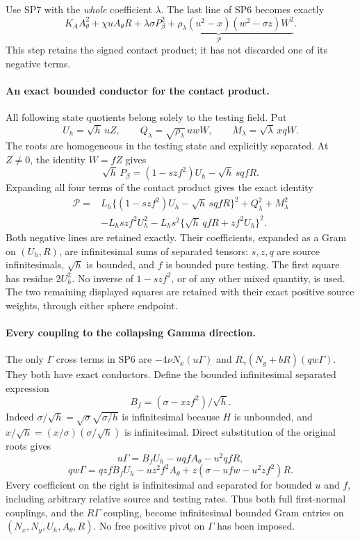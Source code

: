 Use SP7 with the \emph{whole} coefficient $\lambda$. The last line of
SP6 becomes exactly
\[
 K_A A_\theta^2+\chi uA_\theta R+
 \underbrace{\lambda\sigma P_\beta^2+
       \rho_\lambda(u^2-x)(w^2-\sigma z)W^2}_{\mathscr P}.
 \tag{BS2}
\]
This step retains the signed contact product; it has not discarded
one of its negative terms.

\paragraph{An exact bounded conductor for the contact product.}
All following state quotients belong solely to the testing field.
Put
\[
 U_h=\sqrt h\,uZ,\qquad
 Q_\lambda=\sqrt{\rho_\lambda}\,uwW,\qquad
 M_\lambda=\sqrt\lambda\,xqW.
\]
The roots are homogeneous in the testing state and explicitly separated.
At $Z\ne0$, the identity $W=fZ$ gives
\[
 \sqrt h\,P_\beta=(1-szf^2)U_h-\sqrt h\,sqfR.
 \tag{BS3}
\]
Expanding all four terms of the contact product gives the exact identity
\[
\begin{split}
 \mathscr P={}&L_h\{(1-szf^2)U_h-\sqrt h\,sqfR\}^2
                  +Q_\lambda^2+M_\lambda^2\\
 &-L_hszf^2U_h^2
       -L_hs^2\{\sqrt h\,qfR+zf^2U_h\}^2 .
\end{split}                                                   \tag{BS4}
\]
Both negative lines are retained exactly. Their coefficients, expanded
as a Gram on $(U_h,R)$, are infinitesimal sums of separated tensors:
$s,z,q$ are source infinitesimals, $\sqrt h$ is bounded, and $f$
is bounded pure testing. The first square has residue $2U_h^2$.
No inverse of $1-szf^2$, or of any other mixed quantity, is used.
The two remaining displayed squares are retained with their exact
positive source weights, through either sphere endpoint.

\paragraph{Every coupling to the collapsing Gamma direction.}
The only $\Gamma$ cross terms in SP6 are
$-4\nu N_x(u\Gamma)$ and
$R_\gamma(N_y+bR)(qw\Gamma)$. They both have exact conductors.
Define the bounded infinitesimal separated expression
\[
 B_f=(\sigma-xzf^2)/\sqrt h.
\]
Indeed $\sigma/\sqrt h=\sqrt{\sigma}\sqrt{\sigma/h}$ is infinitesimal
because $H$ is unbounded, and
$x/\sqrt h=(x/\sigma)(\sigma/\sqrt h)$ is infinitesimal.
Direct substitution of the original roots gives
\[
 u\Gamma=B_fU_h-uqfA_\theta-u^2qfR,                 \tag{BS5}
\]
\[
 qw\Gamma=qzfB_fU_h-uz^2f^2A_\theta
                  +z(\sigma-ufw-u^2zf^2)R.         \tag{BS6}
\]
Every coefficient on the right is infinitesimal and separated for
bounded $u$ and $f$, including arbitrary relative source and testing
rates. Thus both full first-normal couplings, and the $R\Gamma$
coupling, become infinitesimal bounded Gram entries on
$(N_x,N_y,U_h,A_\theta,R)$. No free positive pivot on $\Gamma$
has been imposed.

